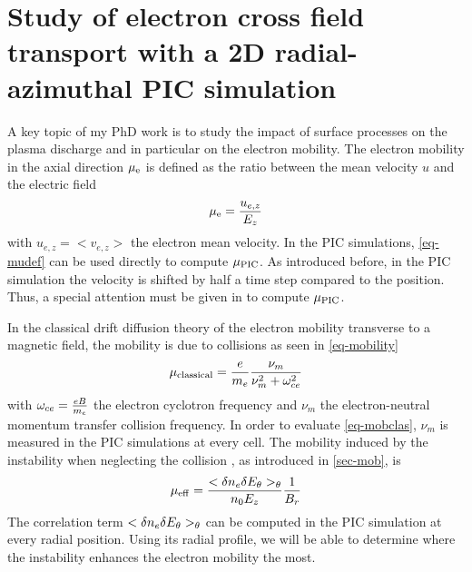 
\section{Study of electron cross field transport with a 2D radial-azimuthal PIC simulation}
  \label{sec-transport}
  

  A key topic of my PhD work is to study the impact of surface processes on the plasma discharge and in particular on the electron mobility.   
  The electron mobility in the axial direction $\mu_{\mathrm{e}}$ is defined as the ratio between the mean velocity $u$ and the electric field
  \begin{equation} \label{eq-mudef}
    \mu_{\mathrm{e}} = \frac{u_{e,z}}{E_z}
  \end{equation}
  with $u_{e,z}=<v_{e,z}>$ the electron mean velocity.
  In the \ac{PIC} simulations, \cref{eq-mudef} can be used directly to compute $\mu_{\mathrm{PIC}}$.
  As introduced before, in the \ac{PIC} simulation the velocity is shifted by half a time step compared to the position.
  Thus, a special attention must be given in to compute $\mu_{\mathrm{PIC}}$.
  
  In the classical drift diffusion theory of the electron mobility transverse to a magnetic field, the mobility is due to collisions as seen in \cref{eq-mobility} 
  \begin{equation} \label{eq-mobclas}
    \mu_{\mathrm{classical}} = \frac{e}{m_e} \frac{\nu_m}{\nu_m^2 + \omega_{ce}^2}
  \end{equation}
  with $\omega_{ce}=\frac{e B}{m_e}$ the electron cyclotron frequency and $\nu_m$ the electron-neutral momentum transfer collision frequency.
  In order to evaluate \cref{eq-mobclas},  $\nu_m$ is measured in the \ac{PIC} simulations at every cell.
  The mobility induced by the instability when neglecting the collision , as introduced in \cref{sec-mob}, is 
  \begin{equation} \label{eq-eq_mobeffsimple_two}
      \mu_{\mathrm{eff}} = \frac{< \delta n_e \delta E_{\theta} >_{\theta} }{n_0 E_z}   \frac{1}{B_r}
  \end{equation}
  The correlation term $< \delta n_e \delta E_{\theta} >_{\theta}$ can be computed in the \ac{PIC} simulation at every radial position.
  Using its radial profile, we will be able to determine where the instability enhances the electron mobility the most.
  

